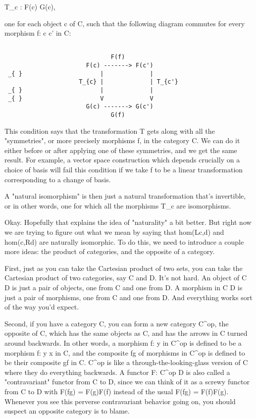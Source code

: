 T_{c} : F(c) \to  G(c),

one for each object c of C, such that the following diagram 
commutes for every morphism f: c \to  c' in C: 


\begin{verbatim}

                              F(f)
                       F(c) -------> F(c') 
 _{ }                      |             |
                     T_{c} |             | T_{c'}
 _{ }                      |             |
 _{ }                      V             V
                       G(c) -------> G(c')
                              G(f)

\end{verbatim}
    
This condition says that the transformation T gets along with all the
"symmetries", or more precisely morphisms f, in the category C.   We
can do it either before or after applying one of these symmetries, and
we get the same result.  For example, a vector space construction which 
depends crucially on a choice of basis will fail this condition if we take 
f to be a linear transformation corresponding to a change of basis. 

A "natural isomorphism" is then just a natural transformation that's
invertible, or in other words, one for which all the morphisms T_{c}
are isomorphisms.

Okay.  Hopefully that explains the idea of "naturality" a bit better.
But right now we are trying to figure out what we mean by 
saying that hom(Lc,d) and hom(c,Rd) are naturally isomorphic.  To do this, 
we need to introduce a couple more ideas: the product of categories,
and the opposite of a category.

First, just as you can take the Cartesian product of two sets, you can take
the Cartesian product of two categories, say C and D.
It's not hard.   An object of C \times  D is just a pair of objects,
one from C and one from D.  A morphism in C \times  D is just a pair of morphisms,
one from C and one from D.  And everything works sort of the way you'd expect.

Second, if you have a category C, you can form a new category
C^{op}, the opposite of C, which has the same objects as C, and
has the arrows in C turned around backwards.  In other words, a morphism
f: \times  \to  y in C^{op} is defined to be a morphism f: y \to  x
in C, and the composite fg of morphisms in C^{op} is defined to
be their composite gf in C.  C^{op} is like a
through-the-looking-glass version of C where they do everything
backwards.  A functor F: C^{op} \to  D is also called a
"contravariant" functor from C to D, since we can think of it
as a screwy functor from C to D with F(fg) = F(g)F(f) instead of the
usual F(fg) = F(f)F(g).  Whenever you see this perverse contravariant
behavior going on, you should suspect an opposite category is to blame.

